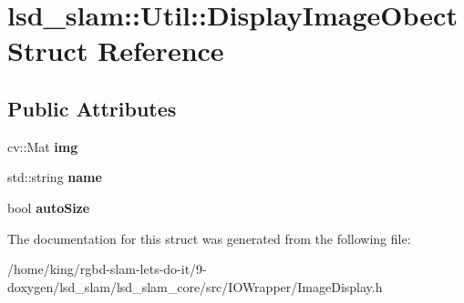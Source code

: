 \hypertarget{structlsd__slam_1_1_util_1_1_display_image_obect}{\section{lsd\-\_\-slam\-:\-:Util\-:\-:Display\-Image\-Obect Struct Reference}
\label{structlsd__slam_1_1_util_1_1_display_image_obect}
}
\subsection*{Public Attributes}
\begin{DoxyCompactItemize}
\item 
\hypertarget{structlsd__slam_1_1_util_1_1_display_image_obect_a5a9e56cbf567324b93f21b59b1dcbcc1}{cv\-::\-Mat {\bfseries img}}\label{structlsd__slam_1_1_util_1_1_display_image_obect_a5a9e56cbf567324b93f21b59b1dcbcc1}

\item 
\hypertarget{structlsd__slam_1_1_util_1_1_display_image_obect_afbb1d3c191f84025a5d31a6e6b699f43}{std\-::string {\bfseries name}}\label{structlsd__slam_1_1_util_1_1_display_image_obect_afbb1d3c191f84025a5d31a6e6b699f43}

\item 
\hypertarget{structlsd__slam_1_1_util_1_1_display_image_obect_adf891dd70a6fcdf4ec835a990d48ff4a}{bool {\bfseries auto\-Size}}\label{structlsd__slam_1_1_util_1_1_display_image_obect_adf891dd70a6fcdf4ec835a990d48ff4a}

\end{DoxyCompactItemize}


The documentation for this struct was generated from the following file\-:\begin{DoxyCompactItemize}
\item 
/home/king/rgbd-\/slam-\/lets-\/do-\/it/9-\/doxygen/lsd\-\_\-slam/lsd\-\_\-slam\-\_\-core/src/\-I\-O\-Wrapper/Image\-Display.\-h\end{DoxyCompactItemize}
